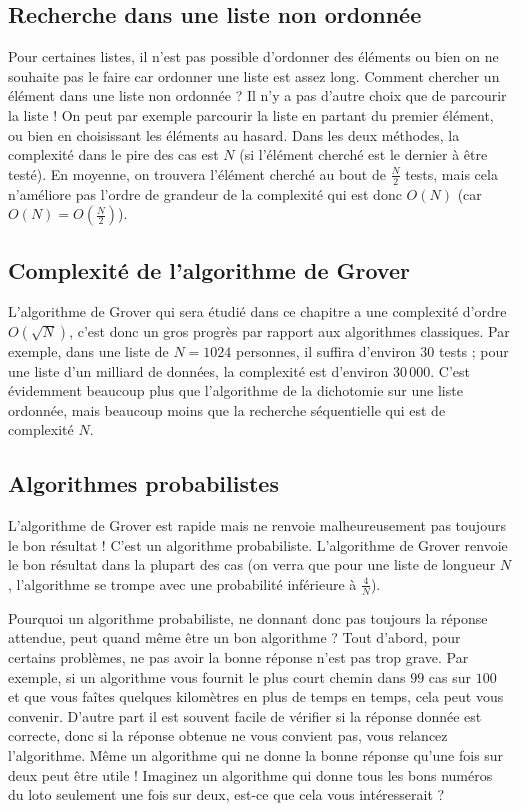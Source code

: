 \documentclass[11pt,class=report,crop=false]{standalone}
\begin{document}
\subsection{Recherche dans une liste non ordonnée}

Pour certaines listes, il n'est pas possible d'ordonner des éléments ou bien on ne souhaite pas le faire car ordonner une liste est assez long.
Comment chercher un élément dans une liste non ordonnée ?
Il n'y a pas d'autre choix que de parcourir la liste ! On peut par exemple parcourir la liste en partant du premier élément, ou bien en choisissant les éléments au hasard.
Dans les deux méthodes, la complexité dans le pire des cas est $N$ (si l'élément cherché est le dernier à être testé). En moyenne, on trouvera l'élément cherché au bout de $\frac{N}{2}$ tests, mais cela n'améliore pas l'ordre de grandeur de la complexité qui est donc $O(N)$ (car $O(N)=O(\frac{N}{2})$).


\subsection{Complexité de l'algorithme de Grover}

L'algorithme de Grover qui sera étudié dans ce chapitre a une complexité d'ordre $O(\sqrt{N})$, c'est donc un gros progrès par rapport aux algorithmes classiques.
Par exemple, dans une liste de $N=1024$ personnes, il suffira d'environ $30$ tests ; 
pour une liste d'un milliard de données, la complexité est d'environ $30\,000$. C'est évidemment beaucoup plus que l'algorithme de la dichotomie sur une liste ordonnée, mais beaucoup moins que la recherche séquentielle qui est de complexité $N$.

\subsection{Algorithmes probabilistes}


L'algorithme de Grover est rapide mais ne renvoie malheureusement pas toujours le bon résultat !
C'est un algorithme probabiliste. L'algorithme de Grover renvoie le bon résultat dans la plupart des cas (on verra que pour une liste de longueur $N$, l'algorithme se trompe avec une probabilité inférieure à $\frac4N$). 

Pourquoi un algorithme probabiliste, ne donnant donc pas toujours la réponse attendue, peut quand même être un bon algorithme ?
Tout d'abord, pour certains problèmes, ne pas avoir la bonne réponse n'est pas trop grave. Par exemple, si un algorithme vous fournit le plus court chemin dans $99$ cas sur $100$ et que vous faîtes quelques kilomètres en plus de temps en temps, cela peut vous convenir. D'autre part il est souvent facile de vérifier si la réponse donnée est correcte, donc si la réponse obtenue ne vous convient pas, vous relancez l'algorithme.
Même un algorithme qui ne donne la bonne réponse qu'une fois sur deux peut être utile ! Imaginez un algorithme qui donne tous les bons numéros du loto seulement une fois sur deux, est-ce que cela vous intéresserait ?
\end{document}
